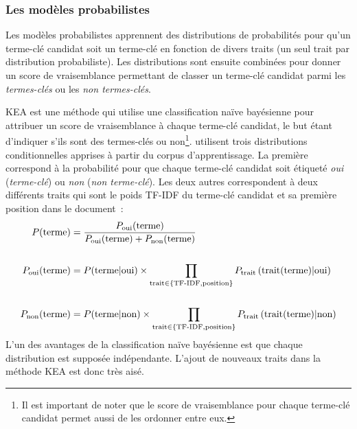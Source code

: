       \subsubsection{Les modèles probabilistes}
      \label{subsubsec:main-state_of_the_art-automatic_keyphrase_extraction-supervised_keyphrase_extraction-probabilistic_models}
        Les modèles probabilistes apprennent des distributions de probabilités pour qu'un terme-clé
        candidat soit un terme-clé en fonction de divers traits (un seul trait
        par distribution probabiliste). Les distributions sont ensuite
        combinées pour donner un score de vraisemblance permettant de classer
        un terme-clé candidat parmi les \textit{termes-clés} ou les
        \textit{non termes-clés}.

        KEA \cite{witten1999kea} est une méthode qui utilise une
        classification naïve bayésienne pour attribuer un score de
        vraisemblance à chaque terme-clé candidat, le but étant d'indiquer
        s'ils sont des termes-clés ou non\footnote{Il est important de noter
        que le score de vraisemblance pour chaque terme-clé candidat permet
        aussi de les ordonner entre eux.}.  utilisent
        trois distributions conditionnelles apprises à partir du corpus
        d'apprentissage. La première correspond à la probabilité pour que
        chaque terme-clé candidat soit étiqueté \textit{oui}
        (\textit{terme-clé}) ou \textit{non} (\textit{non terme-clé}). Les
        deux autres correspondent à deux différents traits qui sont le poids
        TF-IDF du terme-clé candidat et sa première position dans le document~:
        \begin{align}
          P(\text{terme}) &= \frac{P_{\text{oui}}(\text{terme})}{P_{\text{oui}}(\text{terme}) + P_{\text{non}}(\text{terme})} \label{math:kea}\\
          \notag\\
          P_{\text{oui}}(\text{terme}) &= P(\text{terme} | \text{oui}) \times \prod_{\text{trait} \in \{\text{TF-IDF}, \text{position}\}} P_{\text{trait}}\left(\text{trait}(\text{terme}) | \text{oui}\right) \notag\\
          \notag\\
          P_{\text{non}}(\text{terme}) &= P(\text{terme} | \text{non}) \times \prod_{\text{trait} \in \{\text{TF-IDF}, \text{position}\}} P_{\text{trait}}\left(\text{trait}(\text{terme}) | \text{non}\right) \notag
        \end{align}
        L'un des avantages de la classification naïve bayésienne est que
        chaque distribution est supposée indépendante. L'ajout de nouveaux
        traits dans la méthode KEA est donc très aisé.
        
